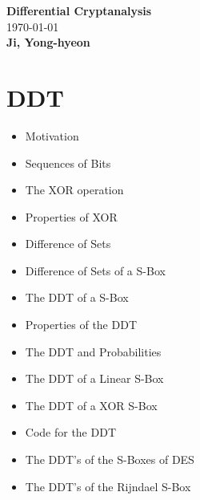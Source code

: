 \documentclass[11pt,openany]{article}
\begin{document}
\begin{center}
	\huge\textbf{Differential Cryptanalysis}\\
	\vspace{0.5em}
	\normalsize{\today}\\
	\vspace{0.5em}
	\large\textbf{Ji, Yong-hyeon}\\
	\vspace{0.5em}
\end{center}

\section{DDT}

\begin{itemize}
	\item Motivation
	\item Sequences of Bits
	\item The XOR operation
	\item Properties of XOR
	\item Difference of Sets
	\item Difference of Sets of a S-Box
	\item The DDT of a S-Box
	\item Properties of the DDT
	\item The DDT and Probabilities
	\item The DDT of a Linear S-Box
	\item The DDT of a XOR S-Box
	\item Code for the DDT
	\item The DDT's of the S-Boxes of DES
	\item The DDT's of the Rijndael S-Box
\end{itemize}
\newpage
\end{document}
